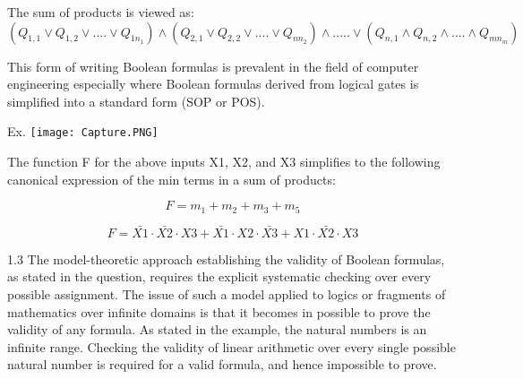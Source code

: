 \documentclass[11pt]{article}
\begin{document}
\begin{enumerate}
The sum of products is viewed as: 
\begin{equation}
    (Q_{1,1} \lor Q_{1,2} \lor .... \lor Q_{1{n_1}}) \land     (Q_{2,1} \lor Q_{2,2} \lor .... \lor Q_{n{n_2}}) \land ..... 
    \lor     (Q_{n,1} \land Q_{n,2} \land .... \land Q_{m{n_m}})
\end{equation}


This form of writing Boolean formulas is prevalent in the field of computer engineering especially where Boolean formulas derived from logical gates is simplified into a standard form (SOP or POS).

Ex.
\texttt{[image: Capture.PNG]}

The function F for the above inputs X1, X2, and X3 simplifies to the following canonical expression of the min terms in a sum of products: 
\newline

\begin{equation}
    F = m_1 + m_2 + m_3 + m_5
\end{equation}

\begin{equation}
    F = \bar{X1} \cdot \bar{X2} \cdot X3   +
    \bar{X1} \cdot X2 \cdot \bar{X3}   +
    X1 \cdot \bar{X2} \cdot X3   
\end{equation}






\newline
\newline
\newline
\newline

1.3
\newline
The model-theoretic approach establishing the validity of Boolean formulas, as stated in the question, requires the explicit systematic checking over every possible assignment. The issue of such a model applied to logics or fragments of mathematics over infinite domains is that it becomes in possible to prove the validity of any formula. As stated in the example, the natural numbers is an infinite range. Checking the validity of linear arithmetic over every single possible natural number is required for a valid formula, and hence impossible to prove.


\newline
\newline
\newline
{}
\newline


\end{enumerate}
\end{document}
